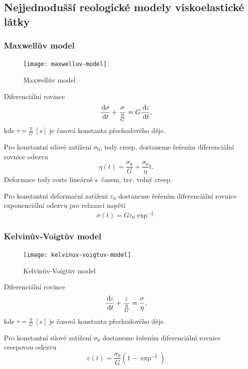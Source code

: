 \subsection{Nejjednodušší reologické modely viskoelastické látky}
\subsubsection{Maxwellův model}
\begin{figure}[H]
	\centering
	\texttt{[image: maxwelluv-model]}
	\caption{Maxwellův model}
	\label{fig:maxwelluv-model}
\end{figure}

Diferenciální rovince
\begin{equation}
	\frac{\,\mathrm{d} \sigma}{\,\mathrm{d} t} + \frac{\sigma}{\frac{\eta}{G}} = G \frac{\,\mathrm{d} \varepsilon}{\,\mathrm{d} t},
\end{equation}
kde $\tau = \frac{\eta}{G}\:[s]$ je časová konstanta přechodového děje.

Pro konstantní silové zatížení $\sigma_0$, tedy creep, dostaneme řešením diferenciální rovnice odezvu
\begin{equation}
	\eta(t) = \frac{\sigma_0}{G} + \frac{\sigma_0}{\eta} t.
\end{equation}
Deformace tedy roste lineárně s~časem, tzv. volný creep.

Pro konstantní deformační zatížení $\varepsilon_0$ dostaneme řešením diferenciální rovnice exponenciální odezvu pro relaxaci napětí
\begin{equation}
	\sigma(t) = G \varepsilon_0 \exp^{-\frac{t}{\tau}}
\end{equation}

\subsubsection{Kelvinův-Voigtův model}
\begin{figure}[H]
	\centering
	\texttt{[image: kelvinuv-voigtuv-model]}
	\caption{Kelvinův-Voigtův model}
	\label{fig:kelvinuv-voigtuv-model}
\end{figure}

Diferenciální rovince
\begin{equation}
	\frac{\,\mathrm{d} \varepsilon}{\,\mathrm{d} t} + \frac{\varepsilon}{\frac{\eta}{G}} = \frac{\sigma}{\eta},
\end{equation}
kde $\tau = \frac{\eta}{G}\:[s]$ je časová konstanta přechodového děje.

Pro konstantní silové zatížení $\sigma_0$ dostaneme řešením diferenciální rovnice creepovou odezvu
\begin{equation}
	\varepsilon(t) = \frac{\sigma_0}{G} \left(1 - \exp^{-\frac{t}{\tau}} \right)
\end{equation}

